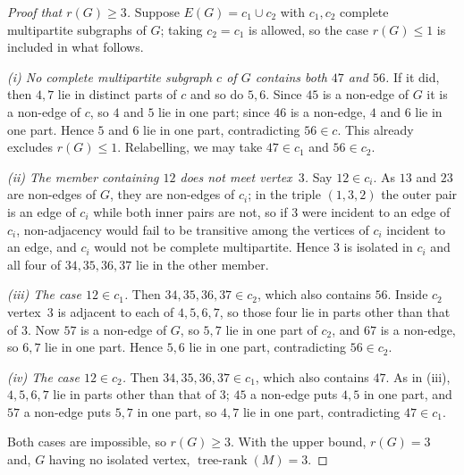 \documentclass[11pt]{amsart}
\theoremstyle{remark}
\DeclareMathOperator{\trank}{tree\text{-}rank}
\begin{document}
\begin{proof}[Proof that $r(G)\ge3$]
Suppose $E(G)=c_1\cup c_2$ with $c_1,c_2$ complete multipartite subgraphs of $G$; taking
$c_2=c_1$ is allowed, so the case $r(G)\le1$ is included in what follows.

\emph{(i) No complete multipartite subgraph $c$ of $G$ contains both $47$ and $56$.} If it did,
then $4,7$ lie in distinct parts of $c$ and so do $5,6$. Since $45$ is a non-edge of $G$ it is
a non-edge of $c$, so $4$ and $5$ lie in one part; since $46$ is a non-edge, $4$ and $6$ lie in
one part. Hence $5$ and $6$ lie in one part, contradicting $56\in c$. This already excludes
$r(G)\le1$. Relabelling, we may take $47\in c_1$ and $56\in c_2$.

\emph{(ii) The member containing $12$ does not meet vertex~$3$.} Say $12\in c_i$. As $13$ and
$23$ are non-edges of $G$, they are non-edges of $c_i$; in the triple $(1,3,2)$ the outer pair
is an edge of $c_i$ while both inner pairs are not, so if $3$ were incident to an edge of
$c_i$, non-adjacency would fail to be transitive among the vertices of $c_i$ incident to an
edge, and $c_i$ would not be complete multipartite. Hence $3$ is isolated in $c_i$ and all four
of $34,35,36,37$ lie in the other member.

\emph{(iii) The case $12\in c_1$.} Then $34,35,36,37\in c_2$, which also contains $56$. Inside
$c_2$ vertex~$3$ is adjacent to each of $4,5,6,7$, so those four lie in parts other than that
of $3$. Now $57$ is a non-edge of $G$, so $5,7$ lie in one part of $c_2$, and $67$ is a
non-edge, so $6,7$ lie in one part. Hence $5,6$ lie in one part, contradicting $56\in c_2$.

\emph{(iv) The case $12\in c_2$.} Then $34,35,36,37\in c_1$, which also contains $47$. As in
(iii), $4,5,6,7$ lie in parts other than that of $3$; $45$ a non-edge puts $4,5$ in one part,
and $57$ a non-edge puts $5,7$ in one part, so $4,7$ lie in one part, contradicting $47\in c_1$.

Both cases are impossible, so $r(G)\ge3$. With the upper bound, $r(G)=3$ and, $G$ having no
isolated vertex, $\trank(M)=3$.
\end{proof}
\end{document}
